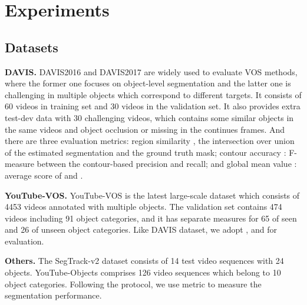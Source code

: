 \documentclass[letterpaper]{article} \usepackage{aaai21}  \usepackage{times}  \usepackage{helvet} \usepackage{courier}  \usepackage[hyphens]{url}  \usepackage{graphicx} \urlstyle{rm} \def\UrlFont{\rm}  \usepackage{graphicx}  \usepackage{natbib}  \usepackage{caption} \frenchspacing  \setlength{\pdfpagewidth}{8.5in}  \setlength{\pdfpageheight}{11in}  \usepackage{amsmath}
\begin{document}
\section{Experiments}
\subsection{Datasets}
\textbf{DAVIS.} DAVIS2016 and DAVIS2017 \cite{pont20172017} are widely used to evaluate VOS methods, where the former one focuses on object-level segmentation and the latter one is challenging in multiple objects which correspond to different targets. 
It consists of 60 videos in training set and 30 videos in the validation set. It also provides extra test-dev data with 30 challenging videos, which contains some similar objects in the same videos and object occlusion or missing in the continues frames. 
And there are three evaluation metrics: region similarity , the intersection over union of the estimated segmentation and the ground truth mask; contour accuracy : F-measure between the contour-based precision and recall; and global mean value : average score of  and .

\noindent \textbf{YouTube-VOS.} YouTube-VOS \cite{xu2018youtube} is the latest large-scale dataset which consists of 4453 videos annotated with multiple objects. The validation set contains 474 videos including 91 object categories, and it has separate measures for 65 of seen and 26 of unseen object categories. Like DAVIS dataset, we adopt ,  and  for evaluation.

\noindent \textbf{Others.} The SegTrack-v2 dataset \cite{li2013video} consists of 14 test video sequences with 24 objects. YouTube-Objects \cite{prest2012learning} comprises 126 video sequences which belong to 10 object categories. Following the protocol, we use metric  to measure the segmentation performance.
\end{document}
